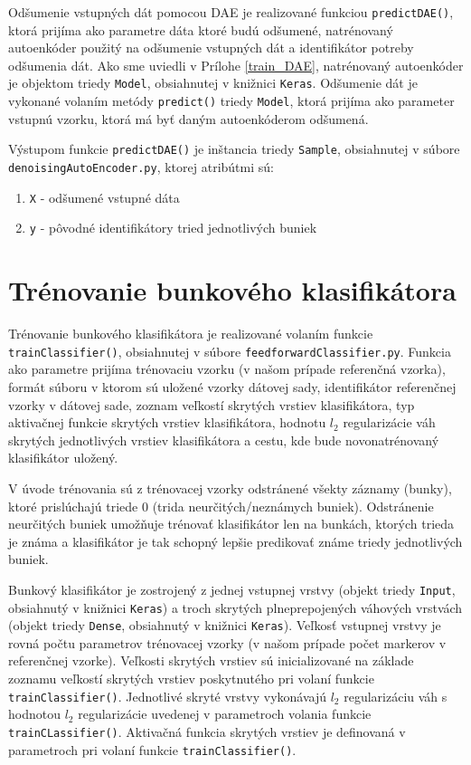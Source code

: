 Odšumenie vstupných dát pomocou DAE je realizované funkciou \texttt{predictDAE()}, ktorá prijíma ako parametre dáta ktoré budú odšumené, natrénovaný autoenkóder použitý na odšumenie vstupných dát a identifikátor potreby odšumenia dát. Ako sme uviedli v Prílohe \ref{train_DAE}, natrénovaný autoenkóder je objektom triedy \texttt{Model}, obsiahnutej v knižnici \texttt{Keras}. Odšumenie dát je vykonané volaním metódy \texttt{predict()} triedy \texttt{Model}, ktorá prijíma ako parameter vstupnú vzorku, ktorá má byť daným autoenkóderom odšumená. 

Výstupom funkcie \texttt{predictDAE()} je inštancia triedy \texttt{Sample}, obsiahnutej v súbore \texttt{denoisingAutoEncoder.py}, ktorej atribútmi sú:
\begin{enumerate}
    \item \texttt{X} - odšumené vstupné dáta
    \item \texttt{y} - pôvodné identifikátory tried jednotlivých buniek
\end{enumerate}

\section{Trénovanie bunkového klasifikátora}
\label{trainFF}

Trénovanie bunkového klasifikátora je realizované volaním funkcie \texttt{trainClassifier()}, obsiahnutej v súbore \texttt{feedforwardClassifier.py}. Funkcia ako parametre prijíma trénovaciu vzorku (v našom prípade referenčná vzorka), formát súboru v ktorom sú uložené vzorky dátovej sady, identifikátor referenčnej vzorky v dátovej sade, zoznam veľkostí skrytých vrstiev klasifikátora, typ aktivačnej funkcie skrytých vrstiev klasifikátora, hodnotu $l_2$ regularizácie váh skrytých jednotlivých vrstiev klasifikátora a cestu, kde bude novonatrénovaný klasifikátor uložený.

V úvode trénovania sú z trénovacej vzorky odstránené všekty záznamy (bunky), ktoré prislúchajú triede $0$ (trida neurčitých/neznámych buniek). Odstránenie neurčitých buniek umožňuje trénovať klasifikátor len na bunkách, ktorých trieda je známa a klasifikátor je tak schopný lepšie predikovať známe triedy jednotlivých buniek. 

Bunkový klasifikátor je zostrojený z jednej vstupnej vrstvy (objekt triedy \texttt{Input}, obsiahnutý v knižnici \texttt{Keras}) a troch skrytých plneprepojených váhových vrstvách (objekt triedy \texttt{Dense}, obsiahnutý v knižnici \texttt{Keras}). Veľkosť vstupnej vrstvy je rovná počtu parametrov trénovacej vzorky (v našom prípade počet markerov v referenčnej vzorke). Veľkosti skrytých vrstiev sú inicializované na základe zoznamu veľkostí skrytých vrstiev poskytnutého pri volaní funkcie \texttt{trainClassifier()}. Jednotlivé skryté vrstvy vykonávajú $l_2$ regularizáciu váh s hodnotou $l_2$ regularizácie uvedenej v parametroch volania funkcie \texttt{trainCLassifier()}. Aktivačná funkcia skrytých vrstiev je definovaná v parametroch pri volaní funkcie \texttt{trainClassifier()}.

